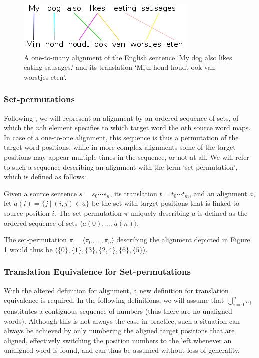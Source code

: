 \begin{figure}
\centering
\includegraphics[scale=0.6]{Graphics/alignment1.png}
\caption{A one-to-many alignment of the English sentence `My dog also likes eating sausages.' and its translation `Mijn hond houdt ook van worstjes eten'.%
\cite{maillette2010visualizing}
}\label{fig:alignment2}
\end{figure}

\subsubsection{Set-permutations}
Following \cite{simaan2013hats}, we will represent an alignment by an ordered sequence of sets, of which the $n$th element specifies to which target word the $n$th source word maps. In case of a one-to-one alignment, this sequence is thus a permutation of the target word-positions, while in more complex alignments some of the target positions may appear multiple times in the sequence, or not at all. We will refer to such a sequence describing an alignment with the term `set-permutation', which is defined as follows:

\begin{definition}\label{def:sperm}
Given a source sentence $s = s_0 \cdots s_n$, its translation $t = t_0 \cdots t_m$, and an alignment $a$, let $a(i) = \{j~|~(i,j)\in a\}$ be the set with target positions that is linked to source position $i$. The set-permutation $\pi$ uniquely describing $a$ is defined as the ordered sequence of sets
$\langle a(0), \ldots, a(n) \rangle$.
\end{definition}

\noindent The set-permutation $\pi = \langle\pi_0, ..., \pi_n\rangle$ describing the alignment depicted in Figure \ref{fig:alignment2} would thus be $\langle \{0\}, \{1\}, \{3\}, \{2,4\}, \{6\}, \{5\}\rangle$. 

\subsubsection{Translation Equivalence for Set-permutations}

With the altered definition for alignment, a new definition for translation equivalence is required. In the following definitions, we will assume that $\bigcup_{i=0}^{n} \pi_i$ constitutes a contiguous sequence of numbers (thus there are no unaligned words). Although this is not always the case in practice, such a situation can always be achieved by only numbering the aligned target positions that are aligned, effectively switching the position numbers to the left whenever an unaligned word is found, and can thus be assumed without loss of generality.

